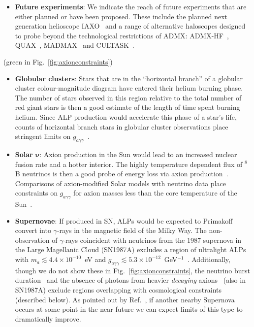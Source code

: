 \begin{itemize}
 \item {\bf Future experiments}: We indicate the reach of future experiments that are either planned or have been proposed. These include the planned next generation helioscope IAXO~\cite{Armengaud:2014gea} and a range of alternative haloscopes designed to probe beyond the technological restrictions of ADMX: ADMX-HF~\cite{Simanovskaia:2015fdi}, QUAX~\cite{Ruoso:2015ytk}, MADMAX~\cite{TheMADMAXWorkingGroup:2016hpc} and CULTASK~\cite{Chung:2016ysi}.
\end{itemize}

{\color{Green}{\bf Astrophysical bounds}} (green in Fig.~\ref{fig:axionconstraints})\vspace{-1em}
\begin{itemize}\itemsep0em 
 \item {\bf Globular clusters}: Stars that are in the ``horizontal branch'' of a globular cluster colour-magnitude diagram have entered their helium burning phase. The number of stars observed in this region relative to the total number of red giant stars is then a good estimate of the length of time spent burning helium. Since ALP production would accelerate this phase of a star's life, counts of horizontal branch stars in globular cluster observations place stringent limits on $g_{a\gamma\gamma}$~\cite{Ayala:2014pea}.
 \item {\bf Solar $\boldsymbol{\nu}$}: Axion production in the Sun would lead to an increased nuclear fusion rate and a hotter interior. The highly temperature dependent flux of $^8$B neutrinos is then a good probe of energy loss via axion production~\cite{Gondolo:2008dd}. Comparisons of axion-modified Solar models with neutrino data place constraints on $g_{a\gamma\gamma}$ for axion masses less than the core temperature of the Sun~\cite{Vinyoles:2015aba}.
 \item {\bf Supernovae}: If produced in SN, ALPs would be expected to Primakoff convert into $\gamma$-rays in the magnetic field of the Milky Way. The non-observation of $\gamma$-rays coincident with neutrinos from the 1987 supernova in the Large Magellanic Cloud (SN1987A) excludes a region of ultralight ALPs with $m_a \lesssim 4.4 \times 10^{-10}$~eV and $g_{a\gamma\gamma} \lesssim 5.3 \times 10^{-12}$~GeV$^{-1}$~\cite{Payez:2014xsa}. Additionally, though we do not show these in Fig.~\ref{fig:axionconstraints}, the neutrino burst duration~\cite{Raffelt:2006cw} and the absence of photons from heavier {\it decaying} axions~\cite{Jaeckel:2017tud} (also in SN1987A) exclude regions overlapping with cosmological constraints (described below). As pointed out by Ref.~\cite{Jaeckel:2017tud}, if another nearby Supernova occurs at some point in the near future we can expect limits of this type to dramatically improve.

\end{itemize}
